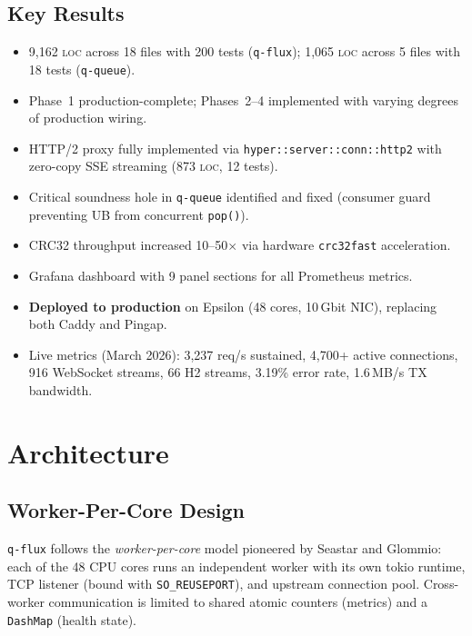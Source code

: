 \documentclass[a4paper, 11pt]{article}
\newcommand{\qflux}{\texttt{q-flux}}
\newcommand{\qqueue}{\texttt{q-queue}}
\newcommand{\loc}{\textsc{loc}}
\begin{document}
\subsection{Key Results}

\begin{itemize}[nosep]
  \item 9,162 \loc{} across 18 files with 200 tests (\qflux{});
        1,065 \loc{} across 5 files with 18 tests (\qqueue{}).
  \item Phase~1 production-complete; Phases~2--4 implemented with
        varying degrees of production wiring.
  \item HTTP/2 proxy fully implemented via \texttt{hyper::server::conn::http2}
        with zero-copy SSE streaming (873 \loc{}, 12 tests).
  \item Critical soundness hole in \qqueue{} identified and fixed
        (consumer guard preventing UB from concurrent \texttt{pop()}).
  \item CRC32 throughput increased 10--50$\times$ via hardware
        \texttt{crc32fast} acceleration.
  \item Grafana dashboard with 9 panel sections for all Prometheus metrics.
  \item \textbf{Deployed to production} on Epsilon (48 cores, 10\,Gbit NIC),
        replacing both Caddy and Pingap.
  \item Live metrics (March 2026): 3,237 req/s sustained, 4,700+ active
        connections, 916 WebSocket streams, 66 H2 streams, 3.19\% error rate,
        1.6\,MB/s TX bandwidth.
\end{itemize}

\section{Architecture}

\subsection{Worker-Per-Core Design}

\qflux{} follows the \emph{worker-per-core} model pioneered by Seastar and
Glommio: each of the 48 CPU cores runs an independent worker with its own
tokio runtime, TCP listener (bound with \texttt{SO\_REUSEPORT}), and
upstream connection pool.  Cross-worker communication is limited to
shared atomic counters (metrics) and a \texttt{DashMap} (health state).
\end{document}
